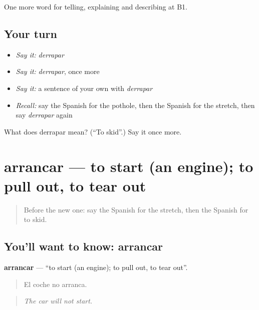 \begin{grammarlens}[title={What you've built}]
One more word for telling, explaining and describing at B1.
\end{grammarlens}

\subsection*{Your turn}
\begin{itemize}
\raggedright
  \item \emph{Say it:} \emph{derrapar}
  \item \emph{Say it:} \emph{derrapar}, once more
  \item \emph{Say it:} a sentence of your own with \emph{derrapar}
  \item \emph{Recall:} say the Spanish for the pothole, then the Spanish for the stretch, then say \emph{derrapar} again
\end{itemize}

\begin{tcolorbox}[breakable,colback=teal!4,colframe=teal!35!black,title={Before you move on}]
What does derrapar mean? (\textquotedblleft{}To skid\textquotedblright{}.) Say it once more.
\end{tcolorbox}
\section[arrancar]{arrancar — to start (an engine); to pull out, to tear out}

\label{lesson:ES-C643-arrancar}



\begin{quote}
Before the new one: say the Spanish for the stretch, then the Spanish for to skid.
\end{quote}

\subsection*{You'll want to know: arrancar}
\textbf{arrancar} — \textquotedblleft{}to start (an engine); to pull out, to tear out\textquotedblright{}.

\begin{quote}
El coche no arranca.
\end{quote}

\begin{quote}
\emph{The car will not start.}
\end{quote}

